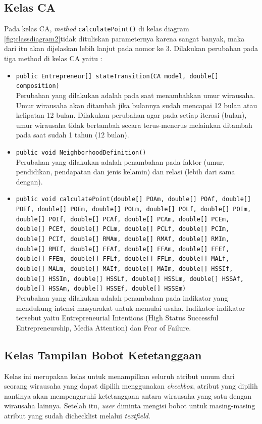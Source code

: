 \subsection{Kelas CA}
Pada kelas CA, \textit{method} \texttt{calculatePoint()} di kelas diagram \ref{fig:classdiagram2}tidak dituliskan parameternya karena sangat banyak, maka dari itu akan dijelaskan lebih lanjut pada nomor ke 3. Dilakukan perubahan pada tiga method di kelas CA yaitu :
\begin{itemize}
	\item \texttt{public Entrepreneur[] stateTransition(CA model, double[] composition)}\\
	Perubahan yang dilakukan adalah pada saat menambahkan umur wirausaha. Umur wirausaha akan ditambah jika bulannya sudah mencapai 12 bulan atau kelipatan 12 bulan. Dilakukan perubahan agar pada setiap iterasi (bulan), umur wirausaha tidak bertambah secara terus-menerus melainkan ditambah pada saat sudah 1 tahun (12 bulan).
	\item \texttt{public void NeighborhoodDefinition() }\\
	Perubahan yang dilakukan adalah penambahan pada faktor (umur, pendidikan, pendapatan dan jenis kelamin) dan relasi (lebih dari sama dengan).
	\item \texttt{public void calculatePoint(double[] POAm, double[] POAf, double[] POEf, double[] POEm, double[] POLm, double[] POLf, double[] POIm, double[] POIf, double[] PCAf, double[] PCAm, double[] PCEm, double[] PCEf, double[] PCLm, double[] PCLf, double[] PCIm, double[] PCIf, double[] RMAm, double[] RMAf, double[] RMIm, double[] RMIf, double[] FFAf, double[] FFAm, double[] FFEf, double[] FFEm, double[] FFLf, double[] FFLm, double[] MALf, double[] MALm, double[] MAIf, double[] MAIm, double[] HSSIf, double[] HSSIm, double[] HSSLf, double[] HSSLm, double[] HSSAf, double[] HSSAm, double[] HSSEf, double[] HSSEm)}\\
	Perubahan yang dilakukan adalah penambahan pada indikator yang mendukung intensi masyarakat untuk memulai usaha. Indikator-indikator tersebut yaitu Entrepreneurial Intentions (High Status Successful Entrepreneurship, Media Attention) dan Fear of Failure.
\end{itemize}



\subsection{Kelas Tampilan Bobot Ketetanggaan}
Kelas ini merupakan kelas untuk menampilkan seluruh atribut umum dari seorang wirausaha yang dapat dipilih menggunakan \textit{checkbox}, atribut yang dipilih nantinya akan mempengaruhi ketetanggaan antara wirausaha yang satu dengan wirausaha lainnya. Setelah itu, \textit{user} diminta mengisi bobot untuk masing-masing atribut yang sudah dichecklist melalui \textit{textfield}.

